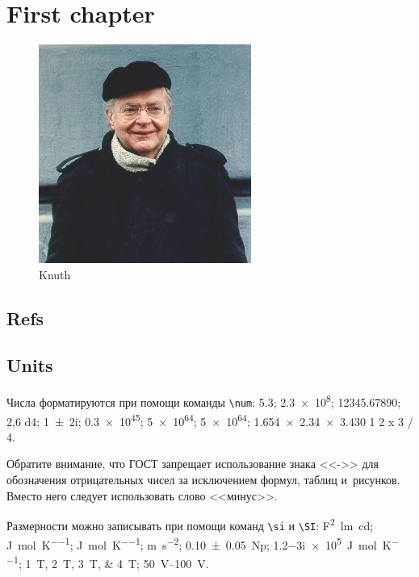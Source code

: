 \chapter{First chapter}
\label{ch:ch1}

\begin{figure}
    \centering
    \includegraphics[width=0.4\linewidth]{images/knuth}
    \caption{Knuth}
    \label{fig:my_label4}
\end{figure}


\section{Refs}

\cite{KKK, Gerasimov2023a, Gerasimov2023b, NikGerbook2022}


\section{Units}\label{sec:units}
Числа форматируются при помощи команды \verb|\num|:
\num{5,3};
\num{2,3e8};
\num{12345,67890};
\num{2,6 d4};
\num{1+-2i};
\num{.3e45};
\num[exponent-base=2]{5 e64};
\num[exponent-base=2,exponent-to-prefix]{5 e64};
\num{1.654 x 2.34 x 3.430}
\num{1 2 x 3 / 4}.


Обратите внимание, что ГОСТ запрещает использование знака <<->> для обозначения отрицательных чисел
за исключением формул, таблиц и~рисунков.
Вместо него следует использовать слово <<минус>>.

Размерности можно записывать при помощи команд \verb|\si| и \verb|\SI|:
\si{\farad\squared\lumen\candela};
\si{\joule\per\mole\per\kelvin};
\si[per-mode = symbol-or-fraction]{\joule\per\mole\per\kelvin};
\si{\metre\per\second\squared};
\SI{0.10(5)}{\neper};
\SI{1.2-3i e5}{\joule\per\mole\per\kelvin};
\SIlist{1;2;3;4}{\tesla};
\SIrange{50}{100}{\volt}.

